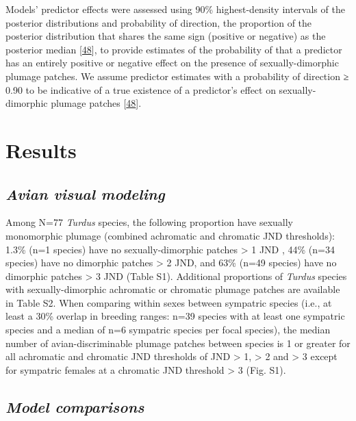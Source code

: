 \documentclass[
  a4paper,
]{article}
\begin{document}
Models' predictor effects were assessed using 90\% highest-density
intervals of the posterior distributions and probability of direction,
the proportion of the posterior distribution that shares the same sign
(positive or negative) as the posterior median
{[}\protect\hyperlink{ref-makowski2019}{48}{]}, to provide estimates of
the probability of that a predictor has an entirely positive or negative
effect on the presence of sexually-dimorphic plumage patches. We assume
predictor estimates with a probability of direction ≥ 0.90 to be
indicative of a true existence of a predictor's effect on
sexually-dimorphic plumage patches
{[}\protect\hyperlink{ref-makowski2019}{48}{]}.

\hypertarget{results}{%
\section{Results}\label{results}}

\hypertarget{avian-visual-modeling}{%
\subsection{\texorpdfstring{\emph{Avian visual
modeling}}{Avian visual modeling}}\label{avian-visual-modeling}}

Among N=77 \emph{Turdus} species, the following proportion have sexually
monomorphic plumage (combined achromatic and chromatic JND thresholds):
1.3\% (n=1 species) have no sexually-dimorphic patches \textgreater{} 1
JND , 44\% (n=34 species) have no dimorphic patches \textgreater{} 2
JND, and 63\% (n=49 species) have no dimorphic patches \textgreater{} 3
JND (Table S1). Additional proportions of \emph{Turdus} species with
sexually-dimorphic achromatic or chromatic plumage patches are available
in Table S2. When comparing within sexes between sympatric species
(i.e., at least a 30\% overlap in breeding ranges: n=39 species with at
least one sympatric species and a median of n=6 sympatric species per
focal species), the median number of avian-discriminable plumage patches
between species is 1 or greater for all achromatic and chromatic JND
thresholds of JND \textgreater{} 1, \textgreater{} 2 and \textgreater{}
3 except for sympatric females at a chromatic JND threshold
\textgreater{} 3 (Fig. S1).

\hypertarget{model-comparisons}{%
\subsection{\texorpdfstring{\emph{Model
comparisons}}{Model comparisons}}\label{model-comparisons}}
\end{document}
